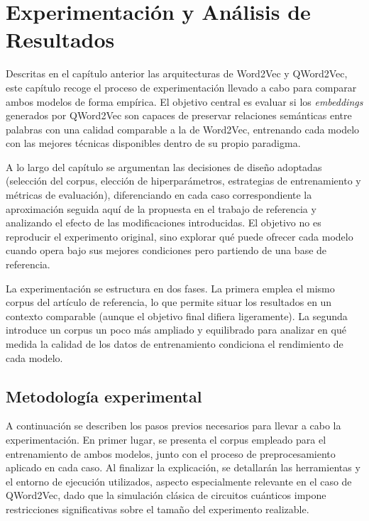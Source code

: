 \chapter{Experimentación y Análisis de Resultados}
\label{chap:experimentacion}

Descritas en el capítulo anterior las arquitecturas de Word2Vec y QWord2Vec, este capítulo recoge el proceso de experimentación llevado a cabo para comparar ambos modelos de forma empírica. El objetivo central es evaluar si los \textit{embeddings} generados por QWord2Vec son capaces de preservar relaciones semánticas entre palabras con una calidad comparable a la de Word2Vec, entrenando cada modelo con las mejores técnicas disponibles dentro de su propio paradigma.

A lo largo del capítulo se argumentan las decisiones de diseño adoptadas (selección del corpus, elección de hiperparámetros, estrategias de entrenamiento y métricas de evaluación), diferenciando en cada caso correspondiente la aproximación seguida aquí de la propuesta en el trabajo de referencia \cite{ohno_qword2vec_2025} y analizando el efecto de las modificaciones introducidas. El objetivo no es reproducir el experimento original, sino explorar qué puede ofrecer cada modelo cuando opera bajo sus mejores condiciones pero partiendo de una base de referencia.

La experimentación se estructura en dos fases. La primera emplea el mismo corpus del artículo de referencia, lo que permite situar los resultados en un contexto comparable (aunque el objetivo final difiera ligeramente). La segunda introduce un corpus un poco más ampliado y equilibrado para analizar en qué medida la calidad de los datos de entrenamiento condiciona el rendimiento de cada modelo.

\section{Metodología experimental}

A continuación se describen los pasos previos necesarios para llevar a cabo la experimentación. En primer lugar, se presenta el corpus empleado para el entrenamiento de ambos modelos, junto con el proceso de preprocesamiento aplicado en cada caso. Al finalizar la explicación, se detallarán las herramientas y el entorno de ejecución utilizados, aspecto especialmente relevante en el caso de QWord2Vec, dado que la simulación clásica de circuitos cuánticos impone restricciones significativas sobre el tamaño del experimento realizable.

